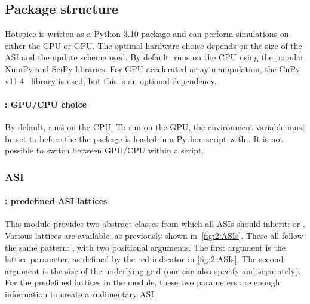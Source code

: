 \subsection{Package structure} %
Hotspice is written as a Python 3.10 package and can perform simulations on either the CPU or GPU.
The optimal hardware choice depends on the size of the ASI and the update scheme used.
By default, \hotspice runs on the CPU using the popular NumPy and SciPy libraries.
For GPU-accelerated array manipulation, the CuPy v11.4~\cite{CuPy} library is used, but this is an optional dependency. \par
\paragraph{: GPU/CPU choice}
By default, \hotspice runs on the CPU. To run on the GPU, the environment variable  must be set to  before the the \hotspice package is loaded in a Python script with . It is not possible to switch between GPU/CPU within a script.
\subsubsection{ASI}
\paragraph{: predefined ASI lattices}
This module provides two abstract classes from which all ASIs should inherit:  or .
Various lattices are available, as previously shown in~\cref{fig:2:ASIs}.
These all follow the same pattern: , with two positional arguments.
The first argument is the lattice parameter, as defined by the red indicator in \cref{fig:2:ASIs}.
The second argument is the size of the underlying grid (one can also specify  and  separately).
For the predefined lattices in the  module, these two parameters are enough information to create a rudimentary ASI.
